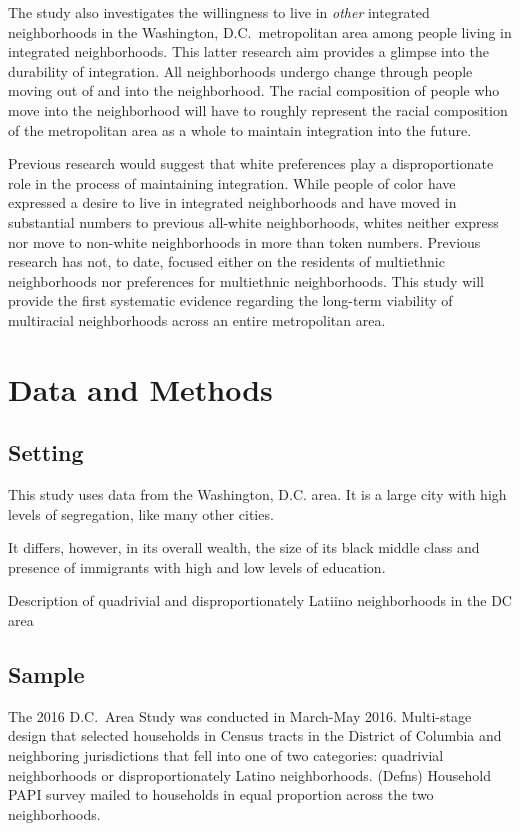 \documentclass[11pt]{baderart}
\begin{document}
The study also investigates the willingness to live in \emph{other} integrated neighborhoods in the Washington, D.C.\ metropolitan area among people living in integrated neighborhoods. This latter research aim provides a glimpse into the durability of integration. All neighborhoods undergo change through people moving out of and into the neighborhood. The racial composition of people who move into the neighborhood will have to roughly represent the racial composition of the metropolitan area as a whole to maintain integration into the future. 

Previous research would suggest that white preferences play a disproportionate role in the process of maintaining integration. While people of color have expressed a desire to live in integrated neighborhoods and have moved in substantial numbers to previous all-white neighborhoods, whites neither express nor move to non-white neighborhoods in more than token numbers. Previous research has not, to date, focused either on the residents of multiethnic neighborhoods nor preferences for multiethnic neighborhoods. This study will provide the first systematic evidence regarding the long-term viability of multiracial neighborhoods across an entire metropolitan area. 

\section{Data and Methods}
\subsection{Setting}
This study uses data from the Washington, D.C. area. It is a large city with high levels of segregation, like many other cities. 

It differs, however, in its overall wealth, the size of its black middle class and presence of immigrants with high and low levels of education. 

Description of quadrivial and disproportionately Latiino neighborhoods in the DC area

\subsection{Sample}
The 2016 D.C.\ Area Study was conducted in March-May 2016. Multi-stage design that selected households in Census tracts in the District of Columbia and neighboring jurisdictions that fell into one of two categories: quadrivial neighborhoods or disproportionately Latino neighborhoods. (Defns) Household PAPI survey mailed to households in equal proportion across the two neighborhoods. 
\end{document}
